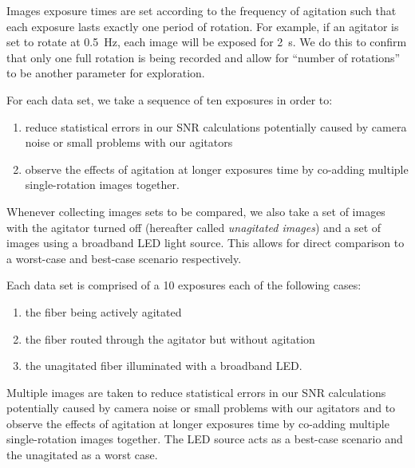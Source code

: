 \documentclass[twocolumn]{emulateapj}
\begin{document}
Images exposure times are set according to the frequency of agitation such that each exposure lasts exactly one period of rotation. For example, if an agitator is set to rotate at \SI{0.5}{\hertz}, each image will be exposed for \SI{2}{\second}. We do this to confirm that only one full rotation is being recorded and allow for ``number of rotations'' to be another parameter for exploration.

For each data set, we take a sequence of ten exposures in order to:
\begin{enumerate}
\item reduce statistical errors in our SNR calculations potentially caused by camera noise or small problems with our agitators
\item observe the effects of agitation at longer exposures time by co-adding multiple single-rotation images together. 
\end{enumerate}
Whenever collecting images sets to be compared, we also take a set of images with the agitator turned off (hereafter called \textit{unagitated images}) and a set of images using a broadband LED light source. This allows for direct comparison to a worst-case and best-case scenario respectively.

Each data set is comprised of a 10 exposures each of the following cases:
\begin{enumerate}
\item the fiber being actively agitated
\item the fiber routed through the agitator but without agitation
\item the unagitated fiber illuminated with a broadband LED.
\end{enumerate}
Multiple images are taken to reduce statistical errors in our SNR calculations potentially caused by camera noise or small problems with our agitators and to observe the effects of agitation at longer exposures time by co-adding multiple single-rotation images together. The LED source acts as a best-case scenario and the unagitated as a worst case.
\end{document}
